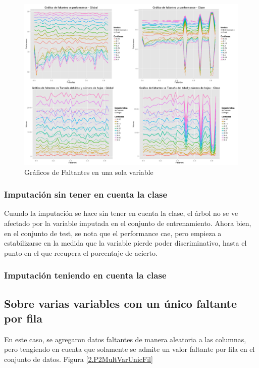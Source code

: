 \documentclass[]{article}
\begin{document}
\begin{figure}[H]
	\includegraphics[scale = 0.27]{2_1_Unic_Col}
	\caption[Faltantes Unica variable]{Gráficos de Faltantes en una sola variable}
	\label{2.P2Unic_Var}
\end{figure}


\subsubsection{Imputación sin tener en cuenta la clase}
Cuando la imputación se hace sin tener en cuenta la clase, el árbol no se ve afectado por la variable imputada en el conjunto de entrenamiento. Ahora bien, en el conjunto de test, se nota que el performance cae, pero empieza a estabilizarse en la medida que la variable pierde poder discriminativo, hasta el punto en el que recupera el porcentaje de acierto.

\subsubsection{Imputación teniendo en cuenta la clase}

\subsection{Sobre varias variables con un único faltante por fila}
En este caso, se agregaron datos faltantes de manera aleatoria a las columnas, pero tengiendo en cuenta que solamente se admite un valor faltante por fila en el conjunto de datos. Figura \ref{2.P2MultVarUnicFil} 
\end{document}
